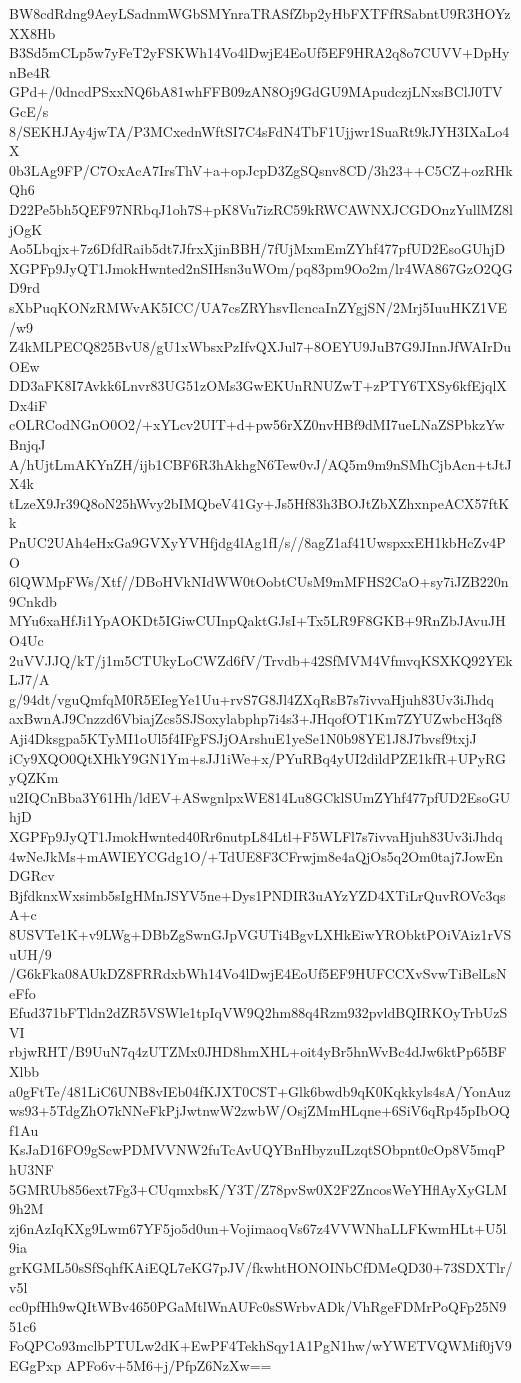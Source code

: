 BW8cdRdng9AeyLSadnmWGbSMYnraTRASfZbp2yHbFXTFfRSabntU9R3HOYzXX8Hb
B3Sd5mCLp5w7yFeT2yFSKWh14Vo4lDwjE4EoUf5EF9HRA2q8o7CUVV+DpHynBe4R
GPd+/0dncdPSxxNQ6bA81whFFB09zAN8Oj9GdGU9MApudczjLNxsBClJ0TVGcE/s
8/SEKHJAy4jwTA/P3MCxednWftSI7C4sFdN4TbF1Ujjwr1SuaRt9kJYH3IXaLo4X
0b3LAg9FP/C7OxAcA7IrsThV+a+opJcpD3ZgSQsnv8CD/3h23++C5CZ+ozRHkQh6
D22Pe5bh5QEF97NRbqJ1oh7S+pK8Vu7izRC59kRWCAWNXJCGDOnzYullMZ8ljOgK
Ao5Lbqjx+7z6DfdRaib5dt7JfrxXjinBBH/7fUjMxmEmZYhf477pfUD2EsoGUhjD
XGPFp9JyQT1JmokHwnted2nSIHsn3uWOm/pq83pm9Oo2m/lr4WA867GzO2QGD9rd
sXbPuqKONzRMWvAK5ICC/UA7csZRYhsvIlcncaInZYgjSN/2Mrj5IuuHKZ1VE/w9
Z4kMLPECQ825BvU8/gU1xWbsxPzIfvQXJul7+8OEYU9JuB7G9JInnJfWAIrDuOEw
DD3aFK8I7Avkk6Lnvr83UG51zOMs3GwEKUnRNUZwT+zPTY6TXSy6kfEjqlXDx4iF
cOLRCodNGnO0O2/+xYLcv2UIT+d+pw56rXZ0nvHBf9dMI7ueLNaZSPbkzYwBnjqJ
A/hUjtLmAKYnZH/ijb1CBF6R3hAkhgN6Tew0vJ/AQ5m9m9nSMhCjbAcn+tJtJX4k
tLzeX9Jr39Q8oN25hWvy2bIMQbeV41Gy+Js5Hf83h3BOJtZbXZhxnpeACX57ftKk
PnUC2UAh4eHxGa9GVXyYVHfjdg4lAg1fI/s//8agZ1af41UwspxxEH1kbHcZv4PO
6lQWMpFWs/Xtf//DBoHVkNIdWW0tOobtCUsM9mMFHS2CaO+sy7iJZB220n9Cnkdb
MYu6xaHfJi1YpAOKDt5IGiwCUInpQaktGJsI+Tx5LR9F8GKB+9RnZbJAvuJHO4Uc
2uVVJJQ/kT/j1m5CTUkyLoCWZd6fV/Trvdb+42SfMVM4VfmvqKSXKQ92YEkLJ7/A
g/94dt/vguQmfqM0R5EIegYe1Uu+rvS7G8Jl4ZXqRsB7s7ivvaHjuh83Uv3iJhdq
axBwnAJ9Cnzzd6VbiajZcs5SJSoxylabphp7i4s3+JHqofOT1Km7ZYUZwbcH3qf8
Aji4Dksgpa5KTyMI1oUl5f4IFgFSJjOArshuE1yeSe1N0b98YE1J8J7bvsf9txjJ
iCy9XQO0QtXHkY9GN1Ym+sJJ1iWe+x/PYuRBq4yUI2dildPZE1kfR+UPyRGyQZKm
u2IQCnBba3Y61Hh/ldEV+ASwgnlpxWE814Lu8GCklSUmZYhf477pfUD2EsoGUhjD
XGPFp9JyQT1JmokHwnted40Rr6nutpL84Ltl+F5WLFl7s7ivvaHjuh83Uv3iJhdq
4wNeJkMs+mAWIEYCGdg1O/+TdUE8F3CFrwjm8e4aQjOs5q2Om0taj7JowEnDGRcv
BjfdknxWxsimb5sIgHMnJSYV5ne+Dys1PNDIR3uAYzYZD4XTiLrQuvROVc3qsA+c
8USVTe1K+v9LWg+DBbZgSwnGJpVGUTi4BgvLXHkEiwYRObktPOiVAiz1rVSuUH/9
/G6kFka08AUkDZ8FRRdxbWh14Vo4lDwjE4EoUf5EF9HUFCCXvSvwTiBelLsNeFfo
Efud371bFTldn2dZR5VSWle1tpIqVW9Q2hm88q4Rzm932pvldBQIRKOyTrbUzSVI
rbjwRHT/B9UuN7q4zUTZMx0JHD8hmXHL+oit4yBr5hnWvBc4dJw6ktPp65BFXlbb
a0gFtTe/481LiC6UNB8vIEb04fKJXT0CST+Glk6bwdb9qK0Kqkkyls4sA/YonAuz
ws93+5TdgZhO7kNNeFkPjJwtnwW2zwbW/OsjZMmHLqne+6SiV6qRp45pIbOQf1Au
KsJaD16FO9gScwPDMVVNW2fuTcAvUQYBnHbyzuILzqtSObpnt0cOp8V5mqPhU3NF
5GMRUb856ext7Fg3+CUqmxbsK/Y3T/Z78pvSw0X2F2ZncosWeYHflAyXyGLM9h2M
zj6nAzIqKXg9Lwm67YF5jo5d0un+VojimaoqVs67z4VVWNhaLLFKwmHLt+U5l9ia
grKGML50sSfSqhfKAiEQL7eKG7pJV/fkwhtHONOINbCfDMeQD30+73SDXTlr/v5l
cc0pfHh9wQItWBv4650PGaMtlWnAUFc0sSWrbvADk/VhRgeFDMrPoQFp25N951c6
FoQPCo93mclbPTULw2dK+EwPF4TekhSqy1A1PgN1hw/wYWETVQWMif0jV9EGgPxp
APFo6v+5M6+j/PfpZ6NzXw==
